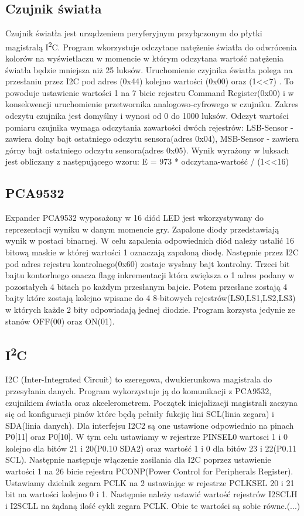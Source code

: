 \documentclass{classrep}
\begin{document}
		\subsection{Czujnik światła}
Czujnik światła jest urządzeniem peryferyjnym przyłączonym do płytki magistralą I\textsuperscript2C. Program wkorzystuje odczytane natężenie światła do odwrócenia kolorów na 			wyświetlaczu w momencie w którym odczytana wartość natężenia światła będzie mniejsza niż 25 luksów. Uruchomienie czyjnika światła polega na przesłaniu przez	
I2C pod adres (0x44) kolejno wartości (0x00) oraz (1<<7) . To powoduje ustawienie wartości 1 na 7 bicie rejestru Command Register(0x00) i w konsekwencji 	uruchomienie przetwornika analogowo-cyfrowego w czujniku. Zakres odczytu czujnika jest domyślny i wynosi od 0 do 1000 luksów. Odczyt wartości pomiaru czujnika wymaga 				odczytania zawartości dwóch rejestrów:  LSB-Sensor - zawiera dolny bajt ostatniego odczytu sensora(adres 0x04), MSB-Sensor - zawiera górny bajt ostatniego odczytu 					sensora(adres 0x05). Wynik wyrażony w luksach jest obliczany z następującego wzoru: E = 973 * odczytana-wartość /  (1<<16)
\subsection{PCA9532}
Expander PCA9532 wyposażony w 16 diód LED jest wkorzystywany do reprezentacji wyniku w danym momencie gry. Zapalone diody przedstawiają wynik w postaci binarnej.
W celu zapalenia odpowiednich diód należy ustalić 16 bitową maskie w której wartości 1 oznaczają zapaloną diodę. Następnie przez I2C pod adres rejestru kontrolnego(0x60)  				zostaje wysłany bajt kontrolny. Trzeci  bit bajtu kontorlnego onacza flagę inkrementacji która zwiększa o 1 adres podany w pozostałych 4 bitach po każdym przesłanym bajcie. 				Potem przesłane zostają 4 bajty które zostają kolejno wpisane do 4  8-bitowych rejestrów(LS0,LS1,LS2,LS3) w których każde 2 bity odpowiadają jednej diodzie. Program korzysta 				jedynie ze stanów OFF(00) oraz ON(01).
\subsection{I\textsuperscript{2}C}
I2C (Inter-Integrated Circuit) to szeregowa, dwukierunkowa magistrala do przesyłania danych. Program wykorzystuje ją do komunikacji z PCA9532, czujnikiem światła oraz 					akcelerometrem.
Początek inicjalizacji magistrali zaczyna się od konfiguracji pinów które będą pełniły fukcjię lini SCL(linia zegara) i SDA(linia danych). Dla interfejsu I2C2 są one ustawione 				odpowiednio na pinach P0[11] oraz P0[10]. W tym celu ustawiamy w rejestrze PINSEL0 wartosci 1 i 0 kolejno dla bitów 21 i 20(P0.10 SDA2) oraz wartość 1 i 0 dla bitów 23 i 22(P0.11 		SCL). Następnie następuje włączenie zasilania dla I2C poprzez ustawienie wartości 1 na 26 bicie rejestru PCONP(Power Control for Peripherals Register). Ustawiamy dzielnik zegara 			PCLK na 2 ustawiając w rejestrze PCLKSEL 20 i 21 bit na wartości kolejno 0 i 1. Następnie należy ustawić wartość rejestrów I2SCLH i I2SCLL na żądaną ilość cykli zegara PCLK. Obie			 	te wartości są sobie równe.(...)
 
\end{document}
